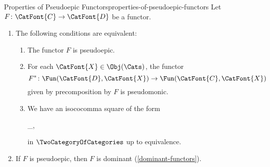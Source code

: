 \begin{proposition}{Properties of Pseudoepic Functors}{properties-of-pseudoepic-functors}%
    Let $F\colon\CatFont{C}\to\CatFont{D}$ be a functor.
    \begin{enumerate}
        \item\label{properties-of-pseudoepic-functors-characterisations}The following conditions are equivalent:
            \begin{enumerate}
                \item\label{properties-of-pseudoepic-functors-characterisations-a}The functor $F$ is pseudoepic.
                \item\label{properties-of-pseudoepic-functors-characterisations-b}For each $\CatFont{X}\in\Obj(\Cats)$, the functor
                    \[
                        F^{*}%
                        \colon%
                        \Fun(\CatFont{D},\CatFont{X})%
                        \to%
                        \Fun(\CatFont{C},\CatFont{X})%
                    \]%
                    given by precomposition by $F$ is pseudomonic.
                \item\label{properties-of-pseudoepic-functors-characterisations-c}We have an isococomma square of the form
                    \begin{webcompile}
                        \eqcong%
                        \isococomma_{},%
                        \quad
                    \end{webcompile}
                    in $\TwoCategoryOfCategories$ up to equivalence.
            \end{enumerate}
        \item\label{properties-of-pseudoepic-functors-dominance}If $F$ is pseudoepic, then $F$ is dominant (\cref{dominant-functors}).
    \end{enumerate}
\end{proposition}
